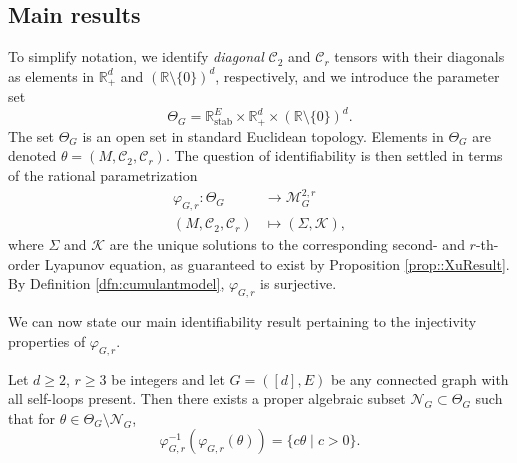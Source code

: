 \documentclass{biometrika}
\begin{document}
\subsection{Main results}

To simplify notation, we identify \emph{diagonal} $\mathcal{C}_2$ and $\mathcal{C}_r$ tensors with 
their diagonals as elements in $\mathbb{R}^{d}_{+}$ and $(\mathbb{R} \setminus \{ 0 \})^d$,
respectively, and we introduce the parameter set 
\begin{equation*}
    \Theta_G = \mathbb{R}^{E}_{\mathrm{stab}} \times \mathbb{R}^{d}_{+} \times (\mathbb{R} \setminus \{ 0 \})^d. 
\end{equation*}
The set $\Theta_{G}$ is an open set in standard Euclidean topology. 
Elements in $\Theta_{G}$ are denoted \mbox{$\theta = (M, \mathcal{C}_2, \mathcal{C}_r)$.}
The question of identifiability is then settled in terms of the rational parametrization  
\begin{align*}
    \varphi_{G,r}: \Theta_G &\rightarrow \mathcal{M}^{2,r}_G \\
    (M, \mathcal{C}_2, \mathcal{C}_r) &\mapsto (\Sigma, \mathcal{K} ),
\end{align*}
where $\Sigma$ and $\mathcal{K} $ are the unique solutions to the corresponding second- and $r$-th-order Lyapunov equation, as guaranteed to exist by Proposition \ref{prop::XuResult}. By Definition \ref{dfn:cumulantmodel}, $\varphi_{G,r}$ is surjective. 

We can now state our main 
identifiability result pertaining to the injectivity properties of $\varphi_{G,r}$.

\begin{theorem}
    \label{thm::GenericIdResult}
    Let $d \geq 2$,  $r \geq 3$ be integers and let $G = ([d], E)$ be any connected graph with all self-loops present. 
    Then there exists a proper algebraic subset $\mathcal{N}_G \subset \Theta_G$ such that for $\theta \in \Theta_G \setminus \mathcal{N}_G$,
    \begin{equation}
        \label{eq::PrecisestatementaboutDimofFiber}
        \varphi^{-1}_{G,r}(\varphi_{G,r}(\theta)) = \{ c \theta \; | \; c > 0 \}. 
    \end{equation}
\end{theorem}
\end{document}

